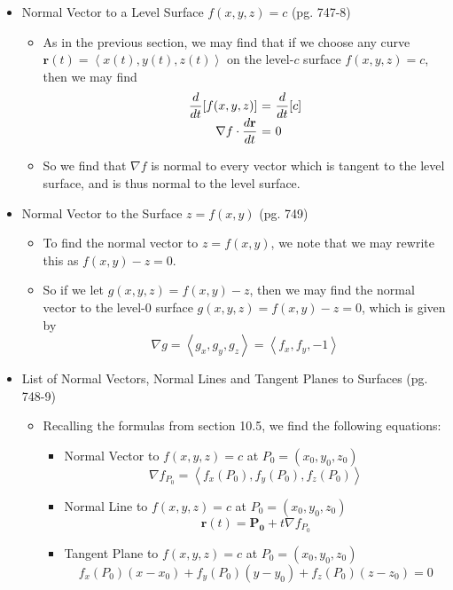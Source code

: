 \documentclass[12pt]{article}
\theoremstyle{plain}
\theoremstyle{definition}
\theoremstyle{remark}
\newcommand{\ds}{\displaystyle}
\newcommand{\vect}[1]{\mathbf{#1}}
\begin{document}
	\begin{itemize}
	
	\item Normal Vector to a Level Surface $f(x,y,z)=c$ (pg. 747-8)
	
		\begin{itemize}
		\item As in the previous section, we may find that if we choose any curve $\vect{r}(t)=\left<x(t),y(t),z(t)\right>$ on the level-$c$ surface $f(x,y,z)=c$, then we may find 
	\[
	\begin{array}{r@{\ =\ }l}\ds
	\frac{d}{dt}[f(x,y,z)]
	&\ds
	\frac{d}{dt}[c]
	\\\ds
	\nabla f \cdot \frac{d\vect{r}}{dt}
	&\ds
	0
	\end{array}
	\]
		\item So we find  that $\nabla f$ is normal to every vector which is tangent to the level surface, and is thus normal to the level surface.
		\end{itemize}
		
	\item Normal Vector to the Surface $z=f(x,y)$ (pg. 749)
	
		\begin{itemize}
		\item To find the normal vector to $z=f(x,y)$, we note that we may rewrite this as $f(x,y)-z=0$.
		\item So if we let $g(x,y,z)=f(x,y)-z$, then we may find the normal vector to the level-$0$ surface $g(x,y,z)=f(x,y)-z=0$, which is given by \[\nabla g=\left<g_x,g_y,g_z\right>=\left<f_x,f_y,-1\right>\]
		\end{itemize}
		
	\item List of Normal Vectors, Normal Lines and Tangent Planes to Surfaces (pg. 748-9)
	
		\begin{itemize}
		\item Recalling the formulas from section 10.5, we find the following equations:
			\begin{itemize}
			\item Normal Vector to $f(x,y,z)=c$ at $P_0=(x_0,y_0,z_0)$
			\[\nabla f_{P_0}=\left<f_x(P_0),f_y(P_0),f_z(P_0)\right>\]
			\item Normal Line to $f(x,y,z)=c$ at $P_0=(x_0,y_0,z_0)$
			\[\vect{r}(t) = \vect{P_0} + t\nabla f_{P_0}\]
			\item Tangent Plane to $f(x,y,z)=c$ at $P_0=(x_0,y_0,z_0)$
			\[f_x(P_0)(x-x_0)+f_y(P_0)(y-y_0)+f_z(P_0)(z-z_0)=0\]
			

\end{itemize}
\end{itemize}
\end{itemize}
\end{document}
